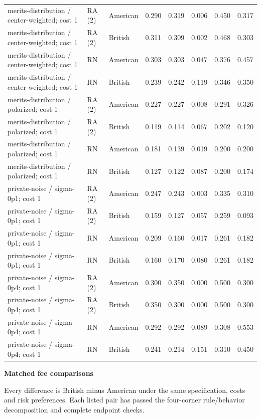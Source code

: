 \documentclass[10pt]{article}
\begin{document}
\begin{longtable}{@{}p{3.0in}llrrrrr@{}}
merits-distribution / center-weighted; cost 1 & RA (2) & American & 0.290 & 0.319 & 0.006 & 0.450 & 0.317\\
merits-distribution / center-weighted; cost 1 & RA (2) & British & 0.311 & 0.309 & 0.002 & 0.468 & 0.303\\
merits-distribution / center-weighted; cost 1 & RN & American & 0.303 & 0.303 & 0.047 & 0.376 & 0.457\\
merits-distribution / center-weighted; cost 1 & RN & British & 0.239 & 0.242 & 0.119 & 0.346 & 0.350\\
merits-distribution / polarized; cost 1 & RA (2) & American & 0.227 & 0.227 & 0.008 & 0.291 & 0.326\\
merits-distribution / polarized; cost 1 & RA (2) & British & 0.119 & 0.114 & 0.067 & 0.202 & 0.120\\
merits-distribution / polarized; cost 1 & RN & American & 0.181 & 0.139 & 0.019 & 0.200 & 0.200\\
merits-distribution / polarized; cost 1 & RN & British & 0.127 & 0.122 & 0.087 & 0.200 & 0.174\\
private-noise / sigma-0p1; cost 1 & RA (2) & American & 0.247 & 0.243 & 0.003 & 0.335 & 0.310\\
private-noise / sigma-0p1; cost 1 & RA (2) & British & 0.159 & 0.127 & 0.057 & 0.259 & 0.093\\
private-noise / sigma-0p1; cost 1 & RN & American & 0.209 & 0.160 & 0.017 & 0.261 & 0.182\\
private-noise / sigma-0p1; cost 1 & RN & British & 0.160 & 0.170 & 0.080 & 0.261 & 0.182\\
private-noise / sigma-0p4; cost 1 & RA (2) & American & 0.300 & 0.350 & 0.000 & 0.500 & 0.300\\
private-noise / sigma-0p4; cost 1 & RA (2) & British & 0.350 & 0.300 & 0.000 & 0.500 & 0.300\\
private-noise / sigma-0p4; cost 1 & RN & American & 0.292 & 0.292 & 0.089 & 0.308 & 0.553\\
private-noise / sigma-0p4; cost 1 & RN & British & 0.241 & 0.214 & 0.151 & 0.310 & 0.450\\
\end{longtable}\normalsize\newpage
{\LARGE\bfseries Matched fee comparisons}\par\medskip
Every difference is British minus American under the same specification, costs and risk preferences. Each listed pair has passed the four-corner rule/behavior decomposition and complete endpoint checks.\par\medskip
\end{document}
